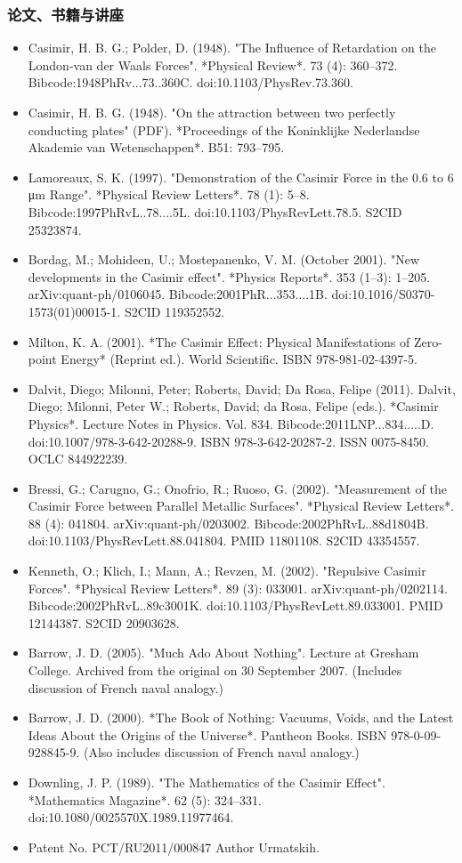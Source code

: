 \subsubsection{论文、书籍与讲座}
\begin{itemize}
\item Casimir, H. B. G.; Polder, D. (1948). "The Influence of Retardation on the London-van der Waals Forces". *Physical Review*. 73 (4): 360–372. Bibcode:1948PhRv...73..360C. doi:10.1103/PhysRev.73.360.
\item Casimir, H. B. G. (1948). "On the attraction between two perfectly conducting plates" (PDF). *Proceedings of the Koninklijke Nederlandse Akademie van Wetenschappen*. B51: 793–795.
\item Lamoreaux, S. K. (1997). "Demonstration of the Casimir Force in the 0.6 to 6 μm Range". *Physical Review Letters*. 78 (1): 5–8. Bibcode:1997PhRvL..78....5L. doi:10.1103/PhysRevLett.78.5. S2CID 25323874.
\item Bordag, M.; Mohideen, U.; Mostepanenko, V. M. (October 2001). "New developments in the Casimir effect". *Physics Reports*. 353 (1–3): 1–205. arXiv:quant-ph/0106045. Bibcode:2001PhR...353....1B. doi:10.1016/S0370-1573(01)00015-1. S2CID 119352552.
\item Milton, K. A. (2001). *The Casimir Effect: Physical Manifestations of Zero-point Energy* (Reprint ed.). World Scientific. ISBN 978-981-02-4397-5.
\item Dalvit, Diego; Milonni, Peter; Roberts, David; Da Rosa, Felipe (2011). Dalvit, Diego; Milonni, Peter W.; Roberts, David; da Rosa, Felipe (eds.). *Casimir Physics*. Lecture Notes in Physics. Vol. 834. Bibcode:2011LNP...834.....D. doi:10.1007/978-3-642-20288-9. ISBN 978-3-642-20287-2. ISSN 0075-8450. OCLC 844922239.
\item Bressi, G.; Carugno, G.; Onofrio, R.; Ruoso, G. (2002). "Measurement of the Casimir Force between Parallel Metallic Surfaces". *Physical Review Letters*. 88 (4): 041804. arXiv:quant-ph/0203002. Bibcode:2002PhRvL..88d1804B. doi:10.1103/PhysRevLett.88.041804. PMID 11801108. S2CID 43354557.
\item Kenneth, O.; Klich, I.; Mann, A.; Revzen, M. (2002). "Repulsive Casimir Forces". *Physical Review Letters*. 89 (3): 033001. arXiv:quant-ph/0202114. Bibcode:2002PhRvL..89c3001K. doi:10.1103/PhysRevLett.89.033001. PMID 12144387. S2CID 20903628.
\item Barrow, J. D. (2005). "Much Ado About Nothing". Lecture at Gresham College. Archived from the original on 30 September 2007. (Includes discussion of French naval analogy.)
\item Barrow, J. D. (2000). *The Book of Nothing: Vacuums, Voids, and the Latest Ideas About the Origins of the Universe*. Pantheon Books. ISBN 978-0-09-928845-9. (Also includes discussion of French naval analogy.)
\item Downling, J. P. (1989). "The Mathematics of the Casimir Effect". *Mathematics Magazine*. 62 (5): 324–331. doi:10.1080/0025570X.1989.11977464.
\item Patent No. PCT/RU2011/000847 Author Urmatskih.
\end{itemize}
